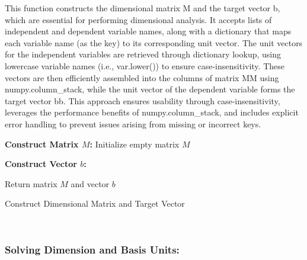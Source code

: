 \documentclass{article}
\begin{document}
This function constructs the dimensional matrix M and the target vector b, which are essential for performing dimensional analysis. It accepts lists of independent and dependent variable names, along with a dictionary that maps each variable name (as the key) to its corresponding unit vector. The unit vectors for the independent variables are retrieved through dictionary lookup, using lowercase variable names (i.e., var.lower()) to ensure case-insensitivity. These vectors are then efficiently assembled into the columns of matrix MM using numpy.column\_stack, while the unit vector of the dependent variable forms the target vector bb. This approach ensures usability through case-insensitivity, leverages the performance benefits of numpy.column\_stack, and includes explicit error handling to prevent issues arising from missing or incorrect keys.\\







\begin{algorithm}[H]
\SetAlgoLined
{}

\textbf{Construct Matrix \(M\):}\;
Initialize empty matrix \(M\)\;

\textbf{Construct Vector \(b\):}\;

Return matrix \(M\) and vector \(b\)\;

\caption{Construct Dimensional Matrix and Target Vector}
\label{alg:get_matrix_target} %
\end{algorithm}\\






\subsubsection{Solving Dimension and Basis Units:}
\end{document}
